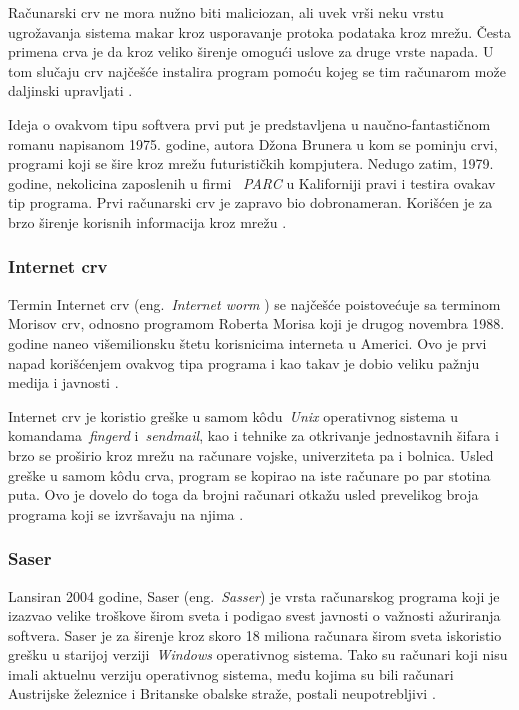 \documentclass[a4paper]{article}
\begin{document}
Računarski crv ne mora nužno biti maliciozan, ali uvek vrši neku vrstu ugrožavanja sistema makar kroz usporavanje protoka podataka kroz mrežu. Česta primena crva je da kroz veliko širenje omogući uslove za druge vrste napada. U tom slučaju crv najčešće instalira program pomoću kojeg se tim računarom može daljinski upravljati \cite{ethics}.

Ideja o ovakvom tipu softvera prvi put je predstavljena u naučno-fantastičnom romanu napisanom 1975. godine, autora Džona Brunera u kom se pominju crvi, programi koji se šire kroz mrežu futurističkih kompjutera. Nedugo zatim, 1979. godine, nekolicina zaposlenih u firmi ~{\em PARC } u Kaliforniji pravi i testira ovakav tip programa.
Prvi računarski crv je zapravo bio dobronameran. Korišćen je za brzo širenje korisnih informacija kroz mrežu \cite{internet_worm}. 


\subsubsection{Internet crv}

Termin Internet crv  (eng.~{\em Internet worm }) se najčešće poistovećuje sa terminom Morisov crv, odnosno programom Roberta Morisa koji je drugog novembra 1988. godine naneo višemilionsku štetu korisnicima interneta u Americi. Ovo je prvi napad korišćenjem ovakvog tipa programa i kao takav je dobio veliku pažnju medija i javnosti \cite{ethics}.

Internet crv je koristio greške u samom kôdu~{\em Unix} operativnog sistema u komandama~{\em fingerd} i~{\em sendmail}, kao i tehnike za otkrivanje jednostavnih šifara i brzo se proširio kroz mrežu na računare vojske, univerziteta pa i bolnica. Usled greške u samom kôdu crva, program se kopirao na iste računare po par stotina puta. Ovo je dovelo do toga da brojni računari otkažu usled prevelikog broja programa koji se izvršavaju na njima \cite{internet_worm}.


\subsubsection{Saser}
Lansiran 2004 godine, Saser (eng.~{\em Sasser}) je vrsta računarskog programa koji je izazvao velike troškove širom sveta i podigao svest javnosti o važnosti ažuriranja softvera. Saser je za širenje kroz skoro 18 miliona računara širom sveta iskoristio grešku u starijoj verziji~{\em Windows} operativnog sistema. Tako su računari koji nisu imali aktuelnu verziju operativnog sistema, među kojima su bili računari Austrijske železnice i Britanske obalske straže, postali neupotrebljivi \cite{ethics}.
\end{document}
